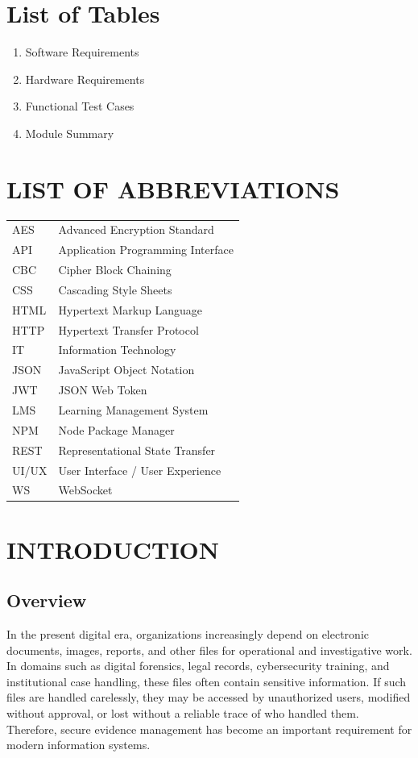 \documentclass[12pt,a4paper]{report}
\begin{document}
\chapter*{List of Tables}
\begin{enumerate}[label=\arabic*.]
\item Software Requirements
\item Hardware Requirements
\item Functional Test Cases
\item Module Summary
\end{enumerate}
\clearpage

\chapter*{LIST OF ABBREVIATIONS}

\begin{longtable}{p{1.5in} p{4.5in}}
AES & Advanced Encryption Standard \\
API & Application Programming Interface \\
CBC & Cipher Block Chaining \\
CSS & Cascading Style Sheets \\
HTML & Hypertext Markup Language \\
HTTP & Hypertext Transfer Protocol \\
IT & Information Technology \\
JSON & JavaScript Object Notation \\
JWT & JSON Web Token \\
LMS & Learning Management System \\
NPM & Node Package Manager \\
REST & Representational State Transfer \\
UI/UX & User Interface / User Experience \\
WS & WebSocket \\
\end{longtable}

\clearpage

\chapter{INTRODUCTION}

\section{Overview}
In the present digital era, organizations increasingly depend on electronic documents, images, reports, and other files for operational and investigative work. In domains such as digital forensics, legal records, cybersecurity training, and institutional case handling, these files often contain sensitive information. If such files are handled carelessly, they may be accessed by unauthorized users, modified without approval, or lost without a reliable trace of who handled them. Therefore, secure evidence management has become an important requirement for modern information systems.
\end{document}
